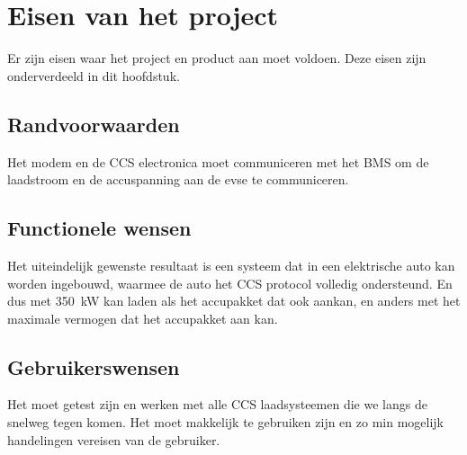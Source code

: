\chapter{Eisen van het project}
\label{Eisen_van_het_project}

Er zijn eisen waar het project en product aan moet voldoen. Deze eisen zijn
onderverdeeld in dit hoofdstuk.

\section{Randvoorwaarden}

Het modem en de CCS electronica moet communiceren met het BMS om de laadstroom en
de accuspanning aan de \ac{evse} te communiceren.

\section{Functionele wensen}

Het uiteindelijk gewenste resultaat is een systeem dat in een elektrische auto
kan worden ingebouwd, waarmee de auto het CCS protocol volledig ondersteund. En
dus met \si{350\kilo\watt} kan laden als het accupakket dat ook aankan, en
anders met het maximale vermogen dat het accupakket aan kan.

\section{Gebruikerswensen}

Het moet getest zijn en werken met alle CCS laadsysteemen die we langs de
snelweg tegen komen. Het moet makkelijk te gebruiken zijn en zo min mogelijk
handelingen vereisen van de gebruiker.


